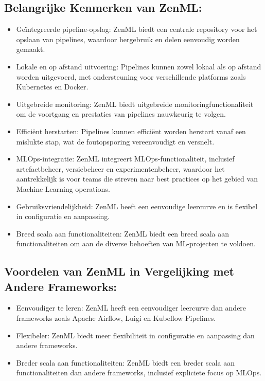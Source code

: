 \subsection{Belangrijke Kenmerken van ZenML:}
\begin{itemize}
    \item Geïntegreerde pipeline-opslag: ZenML biedt een centrale repository voor het opslaan van pipelines, waardoor hergebruik en delen eenvoudig worden gemaakt.
    \item Lokale en op afstand uitvoering: Pipelines kunnen zowel lokaal als op afstand worden uitgevoerd, met ondersteuning voor verschillende platforms zoals Kubernetes en Docker.
    \item Uitgebreide monitoring: ZenML biedt uitgebreide monitoringfunctionaliteit om de voortgang en prestaties van pipelines nauwkeurig te volgen.
    \item Efficiënt herstarten: Pipelines kunnen efficiënt worden herstart vanaf een mislukte stap, wat de foutopsporing vereenvoudigt en versnelt.
    \item MLOps-integratie: ZenML integreert MLOps-functionaliteit, inclusief artefactbeheer, versiebeheer en experimentenbeheer, waardoor het aantrekkelijk is voor teams die streven naar best practices op het gebied van Machine Learning operations.
    \item Gebruiksvriendelijkheid: ZenML heeft een eenvoudige leercurve en is flexibel in configuratie en aanpassing.
    \item Breed scala aan functionaliteiten: ZenML biedt een breed scala aan functionaliteiten om aan de diverse behoeften van ML-projecten te voldoen.
\end{itemize}

\subsection{Voordelen van ZenML in Vergelijking met Andere Frameworks:}
\begin{itemize}
    \item Eenvoudiger te leren: ZenML heeft een eenvoudiger leercurve dan andere frameworks zoals Apache Airflow, Luigi en Kubeflow Pipelines.
    \item Flexibeler: ZenML biedt meer flexibiliteit in configuratie en aanpassing dan andere frameworks.
    \item Breder scala aan functionaliteiten: ZenML biedt een breder scala aan functionaliteiten dan andere frameworks, inclusief expliciete focus op MLOps.
\end{itemize}

